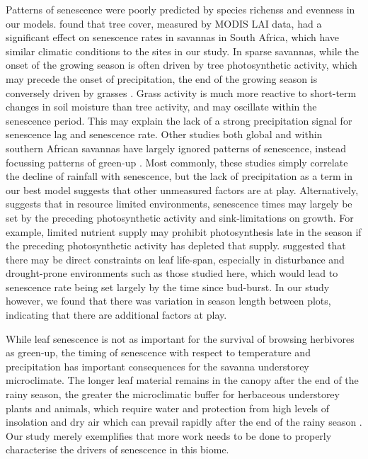 \documentclass[11pt,a4paper]{article}
\begin{document}
Patterns of senescence were poorly predicted by species richenss and evenness in our models. \citet{Cho2017} found that tree cover, measured by MODIS LAI data, had a significant effect on senescence rates in savannas in South Africa, which have similar climatic conditions to the sites in our study. In sparse savannas, while the onset of the growing season is often driven by tree photosynthetic activity, which may precede the onset of precipitation, the end of the growing season is conversely driven by grasses \citep{}. Grass activity is much more reactive to short-term changes in soil moisture than tree activity, and may oscillate within the senescence period. This may explain the lack of a strong precipitation signal for senescence lag and senescence rate. Other studies both global and within southern African savannas have largely ignored patterns of senescence, instead focussing patterns of green-up \citep{Gallinat2015}. Most commonly, these studies simply correlate the decline of rainfall with senescence, but the lack of precipitation as a term in our best model suggests that other unmeasured factors are at play. Alternatively, \citet{Zani2020} suggests that in resource limited environments, senescence times may largely be set by the preceding photosynthetic activity and sink-limitations on growth. For example, limited nutrient supply may prohibit photosynthesis late in the season if the preceding photosynthetic activity has depleted that supply. \citet{Reich1992} suggested that there may be direct constraints on leaf life-span, especially in disturbance and drought-prone environments such as those studied here, which would lead to senescence rate being set largely by the time since bud-burst. In our study however, we found that there was variation in season length between plots, indicating that there are additional factors at play. 

While leaf senescence is not as important for the survival of browsing herbivores as green-up, the timing of senescence with respect to temperature and precipitation has important consequences for the savanna understorey microclimate. The longer leaf material remains in the canopy after the end of the rainy season, the greater the microclimatic buffer for herbaceous understorey plants and animals, which require water and protection from high levels of insolation and dry air which can prevail rapidly after the end of the rainy season \citep{}. Our study merely exemplifies that more work needs to be done to properly characterise the drivers of senescence in this biome.
\end{document}
